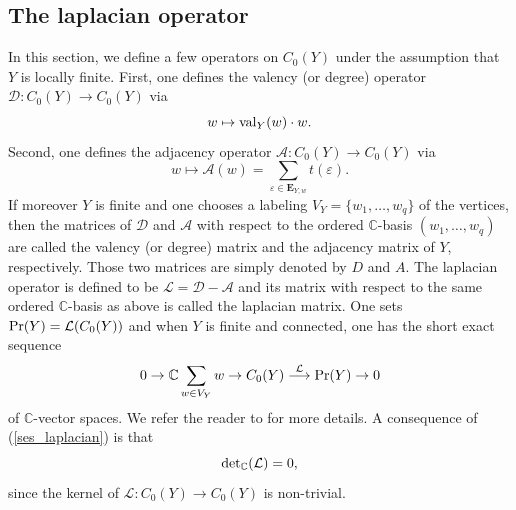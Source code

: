 \documentclass[11pt]{amsart}
\numberwithin{equation}{section}
\theoremstyle{remark}
\theoremstyle{definition}
\begin{document}
\subsection{The laplacian operator} \label{op}
In this section, we define a few operators on $C_{0}(Y)$ under the assumption that $Y$ is locally finite.  First, one defines the valency (or degree) operator $\mathcal{D}:C_{0}(Y) \rightarrow C_{0}(Y)$ via 
$$w \mapsto {\rm val}_{Y}(w) \cdot w.$$  
Second, one defines the adjacency operator $\mathcal{A}:C_{0}(Y) \rightarrow C_{0}(Y)$ via 
$$w \mapsto \mathcal{A}(w) = \sum_{\varepsilon \in \mathbf{E}_{Y,w}} t(\varepsilon). $$
If moreover $Y$ is finite and one chooses a labeling $V_{Y} = \{w_{1},\ldots,w_{q} \}$ of the vertices, then the matrices of $\mathcal{D}$ and $\mathcal{A}$ with respect to the ordered $\mathbb{C}$-basis $(w_{1},\ldots,w_{q})$ are called the valency (or degree) matrix and the adjacency matrix of $Y$, respectively.  Those two matrices are simply denoted by $D$ and $A$.  The laplacian operator is defined to be $\mathcal{L} = \mathcal{D} - \mathcal{A}$ and its matrix with respect to the same ordered $\mathbb{C}$-basis as above is called the laplacian matrix.  One sets ${\rm Pr}(Y) = \mathcal{L}(C_{0}(Y))$ and when $Y$ is finite and connected, one has the short exact sequence
\begin{equation} \label{ses_laplacian}
0 \rightarrow \mathbb{C} \sum_{w \in V_{Y}} w \rightarrow C_{0}(Y) \stackrel{\mathcal{L}}{\longrightarrow} {\rm Pr}(Y) \rightarrow 0
\end{equation}
of $\mathbb{C}$-vector spaces.  We refer the reader to \cite[Theorem 2.3]{Gambheera/Vallieres:2024} for more details.  A consequence of (\ref{ses_laplacian}) is that
\begin{equation} \label{lap_singular}
{\rm det}_{\mathbb{C}}(\mathcal{L}) = 0,
\end{equation}
since the kernel of $\mathcal{L}:C_{0}(Y) \rightarrow C_{0}(Y)$ is non-trivial.



\end{document}
